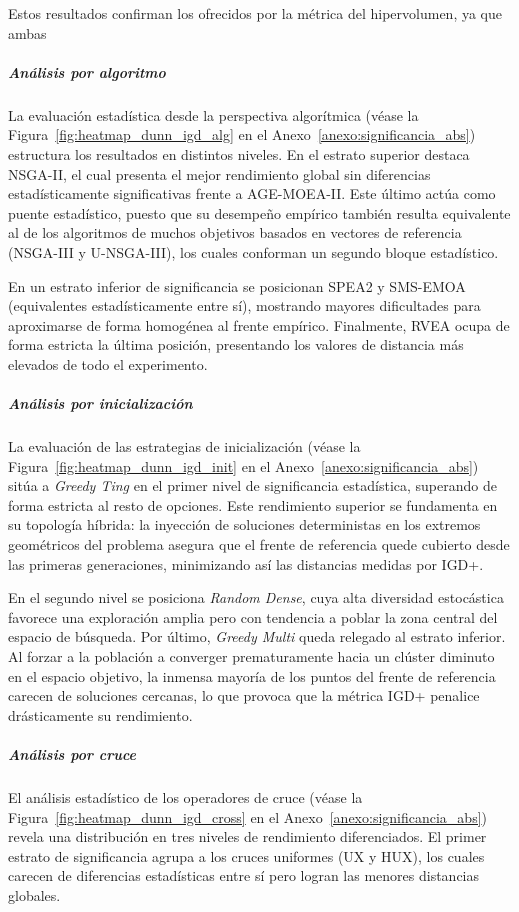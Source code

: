 Estos resultados confirman los ofrecidos por la métrica del hipervolumen, ya que ambas 
\subparagraph{Análisis por algoritmo}

La evaluación estadística desde la perspectiva algorítmica (véase la Figura~\ref{fig:heatmap_dunn_igd_alg} en el Anexo~\ref{anexo:significancia_abs}) estructura los resultados en distintos niveles. En el estrato superior destaca NSGA-II, el cual presenta el mejor rendimiento global sin diferencias estadísticamente significativas frente a AGE-MOEA-II. Este último actúa como puente estadístico, puesto que su desempeño empírico también resulta equivalente al de los algoritmos de muchos objetivos basados en vectores de referencia (NSGA-III y U-NSGA-III), los cuales conforman un segundo bloque estadístico.

En un estrato inferior de significancia se posicionan SPEA2 y SMS-EMOA (equivalentes estadísticamente entre sí), mostrando mayores dificultades para aproximarse de forma homogénea al frente empírico. Finalmente, RVEA ocupa de forma estricta la última posición, presentando los valores de distancia más elevados de todo el experimento.

\subparagraph{Análisis por inicialización}

La evaluación de las estrategias de inicialización (véase la Figura~\ref{fig:heatmap_dunn_igd_init} en el Anexo~\ref{anexo:significancia_abs}) sitúa a \textit{Greedy Ting} en el primer nivel de significancia estadística, superando de forma estricta al resto de opciones. Este rendimiento superior se fundamenta en su topología híbrida: la inyección de soluciones deterministas en los extremos geométricos del problema asegura que el frente de referencia quede cubierto desde las primeras generaciones, minimizando así las distancias medidas por IGD+.

En el segundo nivel se posiciona \textit{Random Dense}, cuya alta diversidad estocástica favorece una exploración amplia pero con tendencia a poblar la zona central del espacio de búsqueda. Por último, \textit{Greedy Multi} queda relegado al estrato inferior. Al forzar a la población a converger prematuramente hacia un clúster diminuto en el espacio objetivo, la inmensa mayoría de los puntos del frente de referencia carecen de soluciones cercanas, lo que provoca que la métrica IGD+ penalice drásticamente su rendimiento.

\subparagraph{Análisis por cruce}

El análisis estadístico de los operadores de cruce (véase la Figura~\ref{fig:heatmap_dunn_igd_cross} en el Anexo~\ref{anexo:significancia_abs}) revela una distribución en tres niveles de rendimiento diferenciados. El primer estrato de significancia agrupa a los cruces uniformes (UX y HUX), los cuales carecen de diferencias estadísticas entre sí pero logran las menores distancias globales. 


